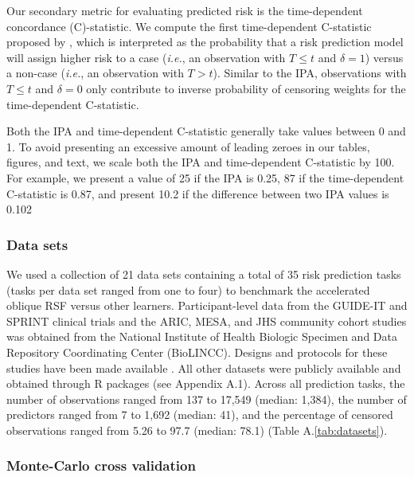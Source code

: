 \documentclass{article}\usepackage[]{graphicx}\usepackage[]{xcolor}
\newcommand{\ie}{\textit{i.e.}}
\newcommand{\tabrefAppendix}[1]{Table A.\ref{#1}}
\begin{document}
Our secondary metric for evaluating predicted risk is the time-dependent concordance (C)-statistic. We compute the first time-dependent C-statistic proposed by \citet[][Equation~3]{blanche2013estimating}, which is interpreted as the probability that a risk prediction model will assign higher risk to a case (\ie, an observation with $T \leq t$ and $\delta = 1$) versus a non-case (\ie, an observation with $T > t$). Similar to the IPA, observations with $T \leq t$ and $\delta = 0$ only contribute to inverse probability of censoring weights for the time-dependent C-statistic.

Both the IPA and time-dependent C-statistic generally take values between 0 and 1. To avoid presenting an excessive amount of leading zeroes in our tables, figures, and text, we scale both the IPA and time-dependent C-statistic by 100. For example, we present a value of 25 if the IPA is 0.25, 87 if the time-dependent C-statistic is 0.87, and present 10.2 if the difference between two IPA values is 0.102

\subsubsection{Data sets}

We used a collection of 21 data sets containing a total of 35 risk prediction tasks (tasks per data set ranged from one to four) to benchmark the accelerated oblique RSF versus other learners. Participant-level data from the GUIDE-IT and SPRINT clinical trials and the ARIC, MESA, and JHS community cohort studies was obtained from the National Institute of Health Biologic Specimen and Data Repository Coordinating Center (BioLINCC). Designs and protocols for these studies have been made available \citep{aric1989atherosclerosis, bild2002multi, felker2017effect, sprint2015randomized, taylor2005toward}. All other datasets were publicly available and obtained through R packages (see Appendix A.1). Across all prediction tasks, the number of observations ranged from 137 to 17,549 (median: 1,384), the number of predictors ranged from 7 to 1,692 (median: 41), and the percentage of censored observations ranged from 5.26 to 97.7 (median: 78.1) (\tabrefAppendix{tab:datasets}).

\subsubsection{Monte-Carlo cross validation}
\end{document}

